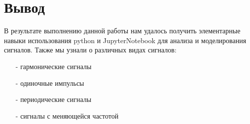 %



\section{Вывод}

В результате выполнению данной работы нам удалось получить элементарные навыки использования python и JupyterNotebook для анализа и моделирования сигналов.
Также мы узнали о различных видах сигналов:

\begin{itemize}
	\item[-]  гармонические сигналы 
	\item[-] одиночные импульсы
	\item[-] периодические сигналы
	\item[-] сигналы с меняющейся частотой
\end{itemize}


